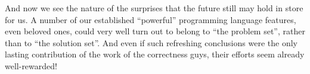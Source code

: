 \documentclass[10pt,letterpaper,twocolumn]{article}
\begin{document}
And now we see the nature of the surprises that the future still may hold in
store for us. A number of our established ``powerful'' programming language
features, even beloved ones, could very well turn out to belong to ``the problem
set'', rather than to ``the solution set''. And even if such refreshing
conclusions were the only lasting contribution of the work of the correctness
guys, their efforts seem already well-rewarded! 
\end{document}
